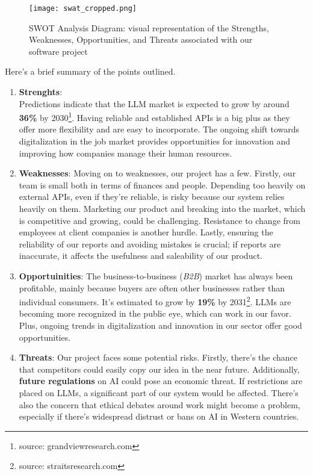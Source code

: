 \documentclass{article}
\begin{document}
\begin{figure}[h]
  \centering
  \texttt{[image: swat\_cropped.png]}
  \caption{\small SWOT Analysis Diagram: visual representation of the Strengths, Weaknesses, Opportunities, and Threats associated with our software project}
\end{figure}

Here's a brief summary of the points outlined.
\begin{enumerate}
    \item \textbf{Strenghts}:\\
Predictions indicate that the LLM market is expected to grow by around \textbf{36\%} by 2030\footnote{source: grandviewresearch.com}. Having reliable and established APIs is a big plus as they offer more flexibility and are easy to incorporate. The ongoing shift towards digitalization in the job market provides opportunities for innovation and improving how companies manage their human resources.
    \item \textbf{Weaknesses}:
Moving on to weaknesses, our project has a few. Firstly, our team is small both in terms of finances and people. Depending too heavily on external APIs, even if they're reliable, is risky because our system relies heavily on them. Marketing our product and breaking into the market, which is competitive and growing, could be challenging. Resistance to change from employees at client companies is another hurdle. Lastly, ensuring the reliability of our reports and avoiding mistakes is crucial; if reports are inaccurate, it affects the usefulness and saleability of our product.
    \item \textbf{Opportuinities}:
The business-to-business (\textit{B2B}) market has always been profitable, mainly because buyers are often other businesses rather than individual consumers. It's estimated to grow by \textbf{19\%} by 2031\footnote{source: straitsresearch.com}. LLMs are becoming more recognized in the public eye, which can work in our favor. Plus, ongoing trends in digitalization and innovation in our sector offer good opportunities.
    \item \textbf{Threats}:
Our project faces some potential risks. Firstly, there's the chance that competitors could easily copy our idea in the near future. Additionally, \textbf{future regulations} on AI could pose an economic threat. If restrictions are placed on LLMs, a significant part of our system would be affected. There's also the concern that ethical debates around work might become a problem, especially if there's widespread distrust or bans on AI in Western countries.
\end{enumerate}
\end{document}
